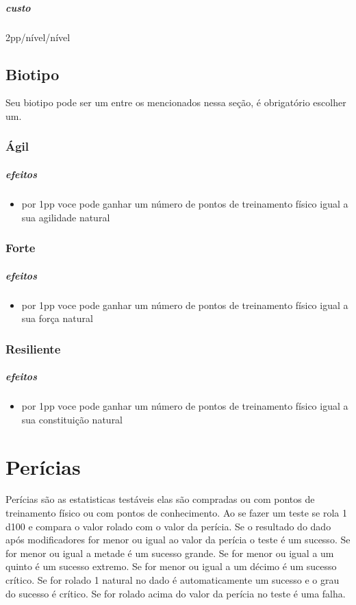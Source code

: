 \paragraph{custo} 2pp/nível/nível
%
%
\section{Biotipo}
Seu biotipo pode ser um entre os mencionados nessa seção, é obrigatório escolher um.
\subsection{Ágil}
\paragraph{efeitos}
\begin{itemize}
  \item por 1pp voce pode ganhar um número de pontos de treinamento
    físico igual a sua agilidade natural
\end{itemize}
\subsection{Forte}
\paragraph{efeitos}
\begin{itemize}
  \item por 1pp voce pode ganhar um número de pontos de treinamento
    físico igual a sua força natural
\end{itemize}
\subsection{Resiliente}
\paragraph{efeitos}
\begin{itemize}
  \item por 1pp voce pode ganhar um número de pontos de treinamento
    físico igual a sua constituição natural
\end{itemize}
%
%
%
%
\chapter{Perícias}
Perícias são as estatisticas testáveis elas são compradas ou com pontos de treinamento
físico ou com pontos de conhecimento.
Ao se fazer um teste se rola 1 d100 e compara o valor rolado com o valor da perícia.
Se o resultado do dado após modificadores for menor ou igual ao valor da perícia o teste é um sucesso.
Se for menor ou igual a metade é um sucesso grande.
Se for menor ou igual a um quinto é um sucesso extremo.
Se for menor ou igual a um décimo é um sucesso crítico.
Se for rolado 1 natural no dado é automaticamente
um sucesso e o grau do sucesso é crítico.
Se for rolado acima do valor da perícia no teste é uma falha.

